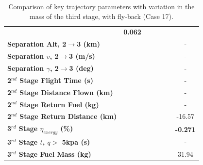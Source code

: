 \begin{table}[ht]
\begin{tabular}{l c c c c c c}
		& \textbf{0.062}
		\\
		\textbf{Separation Alt, 2$\rightarrow$3 (km)}
		& \secondthirdSeparationAltmThreeNinety
		& \secondthirdSeparationAltmThreeNinetyFive
		& \secondthirdSeparationAltmThreeStandard
		& \secondthirdSeparationAltmThreeOneHundredFive
		& \secondthirdSeparationAltmThreeOneHundredTen
		& -
		\\
		\textbf{Separation $v$, 2$\rightarrow$3 (m/s)}
		& \secondthirdSeparationvmThreeNinety
		& \secondthirdSeparationvmThreeNinetyFive
		& \secondthirdSeparationvmThreeStandard
		& \secondthirdSeparationvmThreeOneHundredFive
		& \secondthirdSeparationvmThreeOneHundredTen
		& -
		\\
		\textbf{Separation $\gamma$, 2$\rightarrow$3 (deg)}
		& \secondthirdSeparationgammamThreeNinety
		& \secondthirdSeparationgammamThreeNinetyFive
		& \secondthirdSeparationgammamThreeStandard
		& \secondthirdSeparationgammamThreeOneHundredFive
		& \secondthirdSeparationgammamThreeOneHundredTen
		& -
		\\
		\textbf{2$^{nd}$ Stage Flight Time (s)}
		& \secondFlightTimemThreeNinety
		& \secondFlightTimemThreeNinetyFive
		& \secondFlightTimemThreeStandard
		& \secondFlightTimemThreeOneHundredFive
		& \secondFlightTimemThreeOneHundredTen
		& -
		\\
		\textbf{2$^{nd}$ Stage Distance Flown (km)}
		& \SecondDistmThreeNinety
		& \SecondDistmThreeNinetyFive
		& \SecondDistmThreeStandard
		& \SecondDistmThreeOneHundredFive
		& \SecondDistmThreeOneHundredTen
		& -
		\\
		\textbf{2$^{nd}$ Stage Return Fuel (kg)}
		& \returnFuelmThreeNinety
		& \returnFuelmThreeNinetyFive
		& \returnFuelmThreeStandard
		& \returnFuelmThreeOneHundredFive
		& \returnFuelmThreeOneHundredTen
		& -
		\\
		\textbf{2$^{nd}$ Stage Return Distance (km)}
		& \returnDistmThreeNinety
		& \returnDistmThreeNinetyFive
		& \returnDistmThreeStandard
		& \returnDistmThreeOneHundredFive
		& \returnDistmThreeOneHundredTen
		&-16.57
		\\
		\hline 
		\textbf{3$^{rd}$ Stage $\eta_{exergy}$ (\%)}
		& \textbf{\thirddExergyEffmThreeNinety}
		& \textbf{\thirddExergyEffmThreeNinetyFive}
		& \textbf{\thirddExergyEffmThreeStandard}
		& \textbf{\thirddExergyEffmThreeOneHundredFive}
		& \textbf{\thirddExergyEffmThreeOneHundredTen}
		& \textbf{-0.271}
		\\
		\textbf{3$^{rd}$ Stage $t$, $q >$ 5kpa (s)}
		& \thirdqOverFivemThreeNinety
		& \thirdqOverFivemThreeNinetyFive
		& \thirdqOverFivemThreeStandard
		& \thirdqOverFivemThreeOneHundredFive
		& \thirdqOverFivemThreeOneHundredTen
		& -
		\\
		\textbf{3$^{rd}$ Stage Fuel Mass (kg)}
		& \thirdmFuelmThreeNinety
		& \thirdmFuelmThreeNinetyFive
		& \thirdmFuelmThreeStandard
		& \thirdmFuelmThreeOneHundredFive
		& \thirdmFuelmThreeOneHundredTen
		&31.94
		\\
		\hline 
	\end{tabular} 
	\caption{Comparison of key trajectory parameters with variation in the mass of the third stage, with fly-back (Case 17).}
	\label{tab:comparison81}
\end{table}

